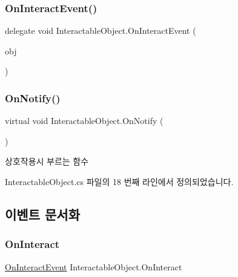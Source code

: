 \subsubsection{\texorpdfstring{OnInteractEvent()}{OnInteractEvent()}}
{\footnotesize\ttfamily delegate void Interactable\+Object.\+On\+Interact\+Event (\begin{DoxyParamCaption}\item[{Game\+Object}]{obj }\end{DoxyParamCaption})}

\mbox{\label{class_interactable_object_aa5c752d17471fe0daf58a4d00c218a29}} 
\subsubsection{\texorpdfstring{OnNotify()}{OnNotify()}}
{\footnotesize\ttfamily virtual void Interactable\+Object.\+On\+Notify (\begin{DoxyParamCaption}{ }\end{DoxyParamCaption})\hspace{0.3cm}{\ttfamily [virtual]}}



상호작용시 부르는 함수 



Interactable\+Object.\+cs 파일의 18 번째 라인에서 정의되었습니다.


\begin{DoxyCode}{0}

\end{DoxyCode}


\subsection{이벤트 문서화}
\mbox{\label{class_interactable_object_afe5e0b16d86c2ed4abf4a71a1995f7ae}} 
\subsubsection{\texorpdfstring{OnInteract}{OnInteract}}
{\footnotesize\ttfamily \mbox{\hyperlink{class_interactable_object_a70a579e4b09d53e6cb77b5222189d5eb}{On\+Interact\+Event}} Interactable\+Object.\+On\+Interact}



